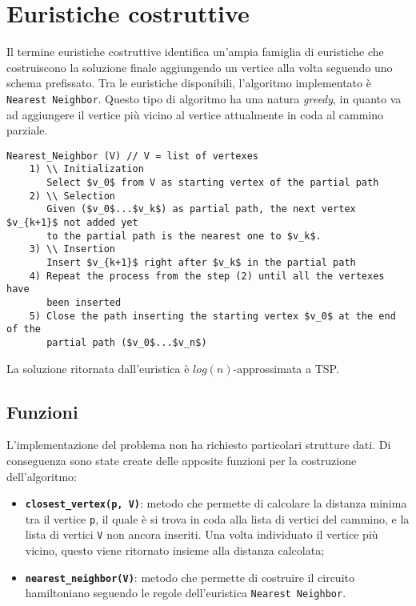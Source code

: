 \section{Euristiche costruttive}\label{constructive_heuristic}

Il termine euristiche costruttive identifica un'ampia famiglia di euristiche che costruiscono la soluzione finale aggiungendo un vertice alla volta seguendo uno schema prefissato. Tra le euristiche disponibili, l'algoritmo implementato è \texttt{Nearest Neighbor}. Questo tipo di algoritmo ha una natura \textit{greedy}, in quanto va ad aggiungere il vertice più vicino al vertice attualmente in coda al cammino parziale.

\begin{lstlisting}[mathescape=true]
Nearest_Neighbor (V) // V = list of vertexes
	1) \\ Initialization
	   Select $v_0$ from V as starting vertex of the partial path
	2) \\ Selection
	   Given ($v_0$...$v_k$) as partial path, the next vertex $v_{k+1}$ not added yet 
	   to the partial path is the nearest one to $v_k$. 
	3) \\ Insertion
	   Insert $v_{k+1}$ right after $v_k$ in the partial path
	4) Repeat the process from the step (2) until all the vertexes have
	   been inserted
	5) Close the path inserting the starting vertex $v_0$ at the end of the
	   partial path ($v_0$...$v_n$)
\end{lstlisting}

La soluzione ritornata dall'euristica è $log(n)$-approssimata a TSP.

\subsection{Funzioni}
L'implementazione del problema non ha richiesto particolari strutture dati. Di conseguenza sono state create delle apposite funzioni per la costruzione dell'algoritmo:
\begin{itemize}
	\item \texttt{\textbf{closest\_vertex(p, V)}}: metodo che permette di calcolare la distanza minima tra il vertice \texttt{p}, il quale è si trova in coda alla lista di vertici del cammino, e la lista di vertici \texttt{V} non ancora inseriti. Una volta individuato il vertice più vicino, questo viene ritornato insieme alla distanza calcolata;
	\item \texttt{\textbf{nearest\_neighbor(V)}}: metodo che permette di costruire il circuito hamiltoniano seguendo le regole dell'euristica \texttt{Nearest Neighbor}. 
\end{itemize}

